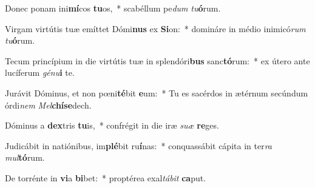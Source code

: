 \item Donec ponam ini\textbf{mí}cos \textbf{tu}os,~* scabéllum pe\textit{dum} \textit{tu}\textbf{ó}rum.
\item Virgam virtútis tuæ emíttet Dómi\textbf{nus} ex \textbf{Si}on:~* domináre in médio inimicó\textit{rum} \textit{tu}\textbf{ó}rum.
\item Tecum princípium in die virtútis tuæ in splendóri\textbf{bus} sanc\textbf{tó}rum:~* ex útero ante lucíferum \textit{gé}\textit{nu}\textbf{i} te.
\item Jurávit Dóminus, et non pœni\textbf{té}bit \textbf{e}um:~* Tu es sacérdos in ætérnum secúndum órdi\textit{nem} \textit{Mel}\textbf{chí}\textbf{se}dech.
\item Dóminus a \textbf{dex}tris \textbf{tu}is,~* confrégit in die iræ \textit{su}\textit{æ} \textbf{re}ges.
\item Judicábit in natiónibus, im\textbf{plé}bit ru\textbf{í}nas:~* conquassábit cápita in ter\textit{ra} \textit{mul}\textbf{tó}rum.
\item De torrénte in \textbf{vi}a \textbf{bi}bet:~* proptérea exal\textit{tá}\textit{bit} \textbf{ca}put.
